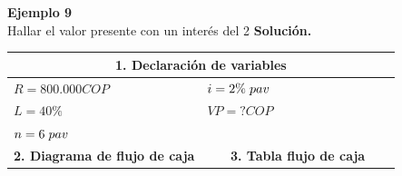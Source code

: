 \textbf{Ejemplo 9}\\
Hallar el valor presente con un interés del 2%
\textbf{Solución.}\\
\begin{center}
 \renewcommand{\arraystretch}{1.5}%
 \begin{longtable}[H]{|p{0.5\linewidth}|p{0.5\linewidth}|}
  \hline
  \multicolumn{2}{|c|}{\cellcolor[HTML]{FFB183}\textbf{1. Declaración de variables}}                                                                                                                                  \\ \hline
  $R = 800.000 COP$                                                                                        & $i = 2\% \hspace{1mm} pav$                                                                                \\
  $L = 40\%$                                                                                            & $VP =  ?COP $                                                                                                  \\
  $n=6 \hspace{1mm} pav$                                                                                                                                                                                              \\ \hline
  \multicolumn{1}{|c|}{\cellcolor[HTML]{FFB183}\textbf{2. Diagrama de flujo de caja}}                   & \multicolumn{1}{|c|}{\cellcolor[HTML]{FFB183}\textbf{3. Tabla flujo de caja}}                               \\ \hline

\end{longtable}
\end{center}

